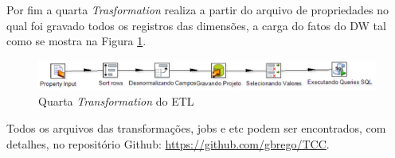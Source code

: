 \begin{apendicesenv}
Por fim a quarta \textit{Trasformation} realiza a partir do arquivo de propriedades no qual foi gravado todos os registros das dimensões, a carga do fatos do DW tal como se mostra na Figura \ref{fourth}.


\begin{figure}[ht!]
\centering
\includegraphics[keepaspectratio=false,scale=0.80]{figuras/fourth.eps}
\caption{Quarta \textit{Transformation} do ETL}
\label{fourth}
\end{figure}
\FloatBarrier

Todos os arquivos das transformações, jobs e etc podem ser encontrados, com detalhes, no repositório Github: \url{https://github.com/gbrego/TCC}.

\end{apendicesenv}
